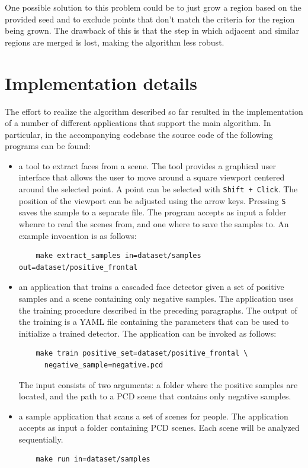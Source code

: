 \documentclass[a4paper,11pt,titlepage]{article}
\begin{document}
One possible solution to this problem could be to just grow a region based on
the provided seed and to exclude points that don't match the criteria for the
region being grown. The drawback of this is that the step in which adjacent and
similar regions are merged is lost, making the algorithm less robust.

\section{Implementation details}
The effort to realize the algorithm described so far resulted in the
implementation of a number of different applications that support the main
algorithm. In particular, in the accompanying codebase the source code of the
following programs can be found:

\begin{itemize}
  \item a tool to extract faces from a scene. The tool provides a graphical user
    interface that allows the user to move around a square viewport centered
    around the selected point. A point can be selected with \texttt{Shift +
    Click}. The position of the viewport can be adjusted using the arrow keys.
    Pressing \texttt{S} saves the sample to a separate file. The program accepts
    as input a folder whenre to read the scenes from, and one where to save the
    samples to. An example invocation is as follows:

    \begin{verbatim}
    make extract_samples in=dataset/samples out=dataset/positive_frontal
    \end{verbatim}

  \item an application that trains a cascaded face detector given a set of
    positive samples and a scene containing only negative samples. The
    application uses the training procedure described in the preceding
    paragraphs. The output of the training is a YAML file containing the
    parameters that can be used to initialize a trained detector. The
    application can be invoked as follows:

    \begin{verbatim}
    make train positive_set=dataset/positive_frontal \
      negative_sample=negative.pcd
    \end{verbatim}

    The input consists of two arguments: a folder where the positive samples are
    located, and the path to a PCD scene that contains only negative samples.

  \item a sample application that scans a set of scenes for people. The
    application accepts as input a folder containing PCD scenes. Each scene will
    be analyzed sequentially.

    \begin{verbatim}
    make run in=dataset/samples
    \end{verbatim}
\end{itemize}
\end{document}
